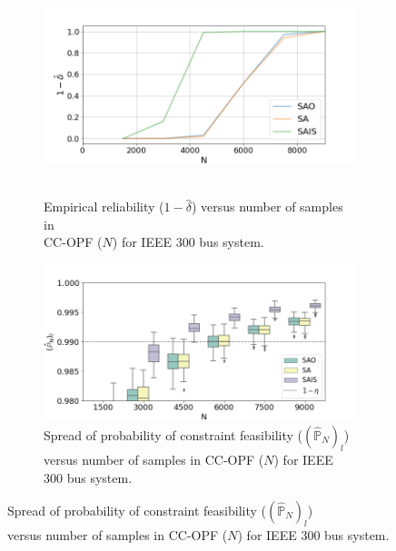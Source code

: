 \begin{figure}[hbt]

\begin{subfigure}{.48\textwidth}
  \centering
  \hspace{-4mm}\includegraphics[width=0.9\linewidth]{Dissertation/images/dc_stochastic_approx/case300/1_beta_N_12000_eta_001.png}~~~~~~\hfill
  \caption{Empirical reliability ($1-\hat{\delta}$) versus number of samples in \\CC-OPF ($N$) for IEEE 300 bus system.}
  \label{fig:ieee300reliability}
\end{subfigure}
\begin{subfigure}{.48\textwidth}
  \centering
  \hspace{-8mm}\includegraphics[width=0.9\linewidth]{Dissertation/images/dc_stochastic_approx/case300/boxplot_J_N_9000_eta_001.png}
  \caption{Spread of probability of constraint feasibility ($(\hat{\mathbb{P}}_N)_l$) \\versus number of samples in CC-OPF ($N$) for IEEE 300 bus system.}
  \label{fig:ieee300conservatism}
\end{subfigure}


\end{figure}
